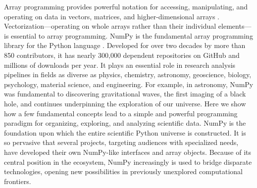 




Array programming provides powerful notation for accessing,
manipulating, and operating on data in vectors, matrices, and
higher-dimensional arrays \cite{iverson1980notation}.
Vectorization---operating on whole arrays rather than their individual
elements---is essential to array programming.
NumPy is the fundamental array programming library for the Python language
\cite{dubois2007guest,oliphant2007python,millman2011python,perez2011python}.
Developed for over two decades by more than 850 contributors, 
it has nearly 300,000 dependent repositories on GitHub and millions of
downloads per year.
It plays an essential role in research analysis pipelines in fields as
diverse as physics, chemistry, astronomy, geoscience, biology, psychology,
material science, and engineering.
For example, in astronomy, NumPy was fundamental to discovering gravitational
waves\cite{pycbc}, the first imaging of a black hole\cite{eht-imaging}, and
continues underpinning the exploration of our
universe\cite{jenness2018lsst}.
Here we show how a few fundamental concepts lead to a simple and
powerful programming paradigm for organizing, exploring, and analyzing
scientific data.
NumPy is the foundation upon which the entire scientific Python
universe is constructed. It is so pervasive that several projects,
targeting audiences with specialized needs, have developed their own
NumPy-like interfaces and array objects.  Because of its central position in the
ecosystem, NumPy increasingly is used to bridge disparate
technologies, opening new possibilities in previously unexplored computational frontiers.

